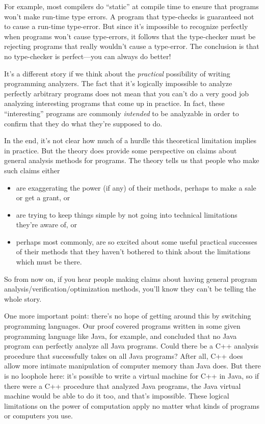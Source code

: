 For example, most compilers do ``static''  at compile
time to ensure that programs won't make run-time type errors.  A program
that type-checks is guaranteed not to cause a run-time type-error.  But
since it's impossible to recognize perfectly when programs won't cause
type-errors, it follows that the type-checker must be rejecting programs
that really wouldn't cause a type-error.  The conclusion is that no
type-checker is perfect---you can always do better!

It's a different story if we think about the \emph{practical}
possibility of writing programming analyzers.  The fact that it's
logically impossible to analyze perfectly arbitrary programs does not
mean that you can't do a very good job analyzing interesting programs
that come up in practice.  In fact, these ``interesting'' programs are
commonly \emph{intended} to be analyzable in order to confirm that
they do what they're supposed to do.

In the end, it's not clear how much of a hurdle this theoretical limitation
implies in practice.  But the theory does provide some perspective
on claims about general analysis methods for programs.  The theory
tells us that people who make such claims either

\begin{itemize}
\item are exaggerating the power (if any) of their methods, perhaps to make a
  sale or get a grant, or

\item are trying to keep things simple by not going into technical
  limitations they're aware of, or

\item perhaps most commonly, are so excited about some useful practical
    successes of their methods that they haven't bothered to think about
    the limitations which must be there.
\end{itemize}

So from now on, if you hear people making claims about having general
program analysis/verification/optimization methods, you'll know they can't
be telling the whole story.

One more important point: there's no hope of getting around this by
switching programming languages.  Our proof covered programs written
in some given programming language like Java, for example, and
concluded that no Java program can perfectly analyze all Java
programs.  Could there be a C++ analysis procedure that successfully
takes on all Java programs?  After all, C++ does allow more intimate
manipulation of computer memory than Java does.  But there is no
loophole here: it's possible to write a virtual machine for C++ in
Java, so if there were a C++ procedure that analyzed Java programs,
the Java virtual machine would be able to do it too, and that's
impossible.  These logical limitations on the power of computation
apply no matter what kinds of programs or computers you use.

